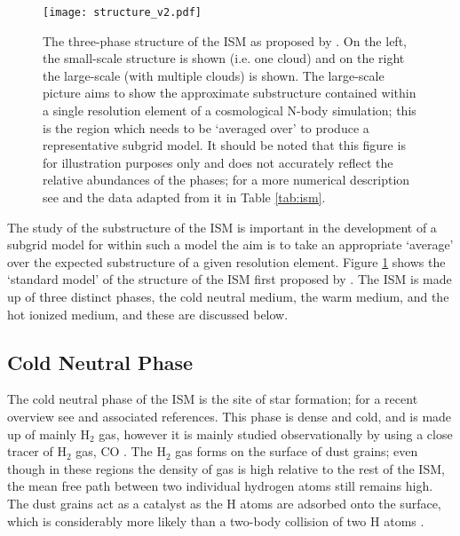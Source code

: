 \begin{figure}[ht]
    \centering

    \texttt{[image: structure\_v2.pdf]}

    \caption{The three-phase structure of the ISM as proposed by \citet{mckee_theory_1977}.
        On the left, the small-scale structure is shown (i.e. one cloud) and on the right the large-scale (with multiple clouds) is shown.
        The large-scale picture aims to show the approximate substructure contained within a single resolution element of a cosmological N-body simulation; this is the region which needs to be `averaged over' to produce a representative subgrid model.
    It should be noted that this figure is for illustration purposes only and does not accurately reflect the relative abundances of the phases; for a more numerical description see \citet{ferriere_interstellar_2001} and the data adapted from it in Table \ref{tab:ism}.}
    \label{fig:struct}
\end{figure}

The study of the substructure of the ISM is important in the development of a subgrid model for within such a model the aim is to take an appropriate `average' over the expected substructure of a given resolution element.
Figure \ref{fig:struct} shows the `standard model' of the structure of the ISM first proposed by \citet{mckee_theory_1977}.
The ISM is made up of three distinct phases, the cold neutral medium, the warm medium, and the hot ionized medium, and these are discussed below.

\subsection{Cold Neutral Phase}

The cold neutral phase of the ISM is the site of star formation; for a recent overview see \citet{mckee_theory_2007} and associated references.
This phase is dense and cold, and is made up of mainly H$_2$ gas, however it is mainly studied observationally by using a close tracer of H$_2$ gas, CO \citep{ferriere_interstellar_2001}.
The H$_2$ gas forms on the surface of dust grains; even though in these regions the density of gas is high relative to the rest of the ISM, the mean free path between two individual hydrogen atoms still remains high.
The dust grains act as a catalyst as the H atoms are adsorbed onto the surface, which is considerably more likely than a two-body collision of two H atoms \citep{gould_interstellar_1963}.

